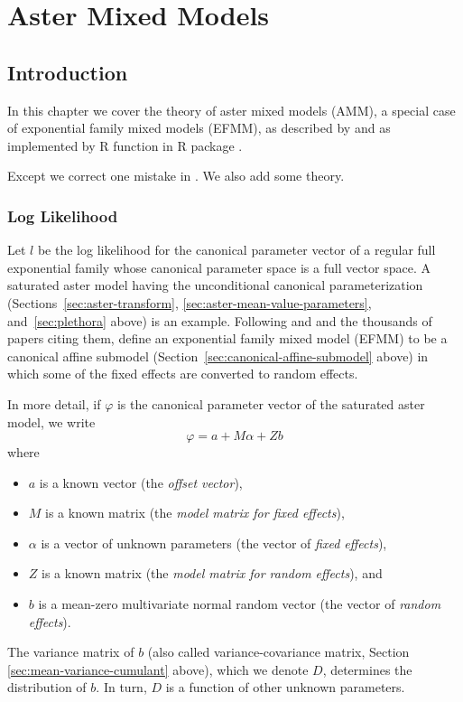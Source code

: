 
\chapter{Aster Mixed Models} \label{ch:reaster}

\section{Introduction}

In this chapter we cover the theory of aster mixed models (AMM),
a special case of exponential family mixed models (EFMM),
as described by \citet{reaster-tr,reaster} and as implemented by
R function  in R package  \citep{aster-package}.

Except we correct one mistake in \citet{reaster}.
We also add some theory.

\subsection{Log Likelihood}

Let $l$ be the log likelihood for the canonical parameter vector of a
regular full exponential family whose canonical parameter space is a
full vector space.  A saturated aster model having the unconditional
canonical parameterization (Sections~\ref{sec:aster-transform},
\ref{sec:aster-mean-value-parameters}, and~\ref{sec:plethora} above)
is an example.  Following \citet{breslow-clayton}
and \citet*{stiratelli-laird-ware} and the thousands of papers citing them,
\citet{reaster} define an exponential family mixed model (EFMM) to be
a canonical affine submodel (Section~\ref{sec:canonical-affine-submodel}
above) in which some of the fixed effects are converted to random effects.

In more detail, if $\varphi$ is the canonical parameter vector of the
saturated aster model, we write
\begin{equation} \label{eq:reaster-model-equation}
   \varphi = a + M \alpha + Z b
\end{equation}
where
\begin{itemize}
\item $a$ is a known vector (the \emph{offset vector}),
\item $M$ is a known matrix (the \emph{model matrix for fixed effects}),
\item $\alpha$ is a vector of unknown parameters (the vector of
    \emph{fixed effects}),
\item $Z$ is a known matrix (the \emph{model matrix for random effects}), and
\item $b$ is a mean-zero multivariate normal random vector (the vector of
    \emph{random effects}).
\end{itemize}
The variance matrix of $b$ (also called variance-covariance matrix,
Section \ref{sec:mean-variance-cumulant} above), which we denote $D$,
determines the distribution of $b$.  In turn, $D$ is a function of
other unknown parameters.

